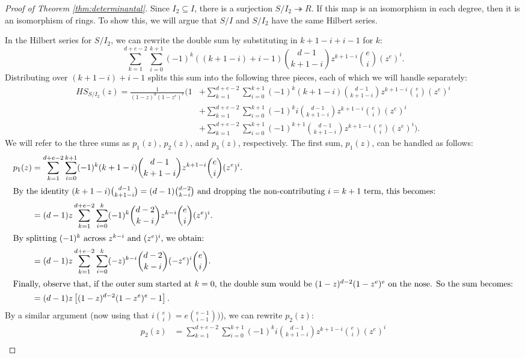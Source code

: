 \documentclass[12pt,reqno]{amsart}
\theoremstyle{definition}
\theoremstyle{remark}
\begin{document}
\begin{proof}[Proof of Theorem \ref{thm:determinantal}]
Since $I_2 \subseteq I$, there is a surjection $S/I_2 \twoheadrightarrow R$.  If this map is an isomorphism in each degree, then it is an isomorphism of rings.  To show this, we will argue that $S/I$ and $S/I_2$ have the same Hilbert series.

In the Hilbert series for $S/I_2$, we can rewrite the double sum by substituting in $k+1-i+i-1$ for $k$:
$$
\sum_{k=1}^{d+e-2}\sum_{i=0}^{k+1}(-1)^k((k+1-i)+i-1)\binom{{d-1}}{{k+1-i}}z^{k+1-i}\binom{e}{i}(z^e)^i.
$$
Distributing over $(k+1-i)+i-1$ splits this sum into the following three pieces, each of which we will handle separately:
\begin{align*}
HS_{S/I_2}(z) = \frac{1}{(1-z)^d(1-z^e)^e}\Bigg( 1&+  \sum_{k=1}^{d+e-2}\sum_{i=0}^{k+1}(-1)^k(k+1-i)\binom{{d-1}}{{k+1-i}}z^{k+1-i}\binom{e}{i}(z^e)^i \\
&+ \sum_{k=1}^{d+e-2}\sum_{i=0}^{k+1}(-1)^ki\binom{d-1 }{ k+1-i}z^{k+1-i}\binom{e}{i}(z^e)^i \\
&+  \sum_{k=1}^{d+e-2}\sum_{i=0}^{k+1}(-1)^{k+1}\binom{d-1}{ k+1-i}z^{k+1-i}\binom{e}{i}(z^e)^i\Bigg).
\end{align*}
We will refer to the three sums as $p_1(z)$, $p_2(z)$, and $p_3(z)$, respectively.
The first sum, $p_1(z)$, can be handled as follows: 
\begin{align*}
p_1(z)&=\sum_{k=1}^{d+e-2}\sum_{i=0}^{k+1}(-1)^k(k+1-i)\binom{{d-1}}{{k+1-i}}z^{k+1-i}\binom{e}{i}(z^e)^i.\\
\intertext{By the identity $(k+1-i) \binom{d-1}{k+1-i} = (d-1)\binom{d-2}{k-i}$ and dropping the non-contributing $i=k+1$ term, this becomes:}
&=(d-1)z\sum_{k=1}^{d+e-2}\sum_{i=0}^{k}(-1)^k\binom{d-2}{k-i} z^{k-i}\binom{e}{i}(z^e)^{i}.\\
\intertext{By splitting $(-1)^k$ across $z^{k-i}$ and $(z^e)^{i}$, we obtain:}
&= (d-1)z\sum_{k=1}^{d+e-2}\sum_{i=0}^{k}(-z)^{k-i}\binom{d-2}{k-i}(-z^e)^{i} \binom{e}{i}.\\
\intertext{Finally, observe that, if the outer sum started at $k=0$, the double sum would be $(1-z)^{d-2}(1-z^e)^e$ on the nose.  So the sum becomes:}
&= (d-1)z\left[(1-z)^{d-2}(1-z^e)^e- 1\right].
\end{align*}
By a similar argument (now using that $i \binom{e}{i} = e \binom{e-1}{i-1})$), we can rewrite $p_2(z)$:
\begin{align*}
p_2(z)&=\sum_{k=1}^{d+e-2}\sum_{i=0}^{k+1}(-1)^ki\binom{d-1}{k+1-i}z^{k+1-i}\binom{e}{i}(z^e)^i\\

\end{align*}
\end{proof}
\end{document}
